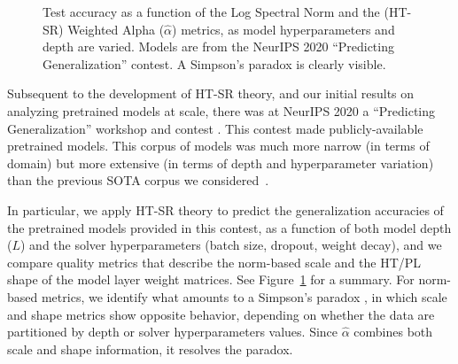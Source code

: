 \documentclass{article}
\begin{document}
\begin{figure}[t!] 
    \centering
    \caption{Test accuracy as a function of 
             the Log Spectral Norm and 
             the (HT-SR) Weighted Alpha ($\hat{\alpha}$) metrics,
             as model hyperparameters and depth are varied. 
             Models are from the NeurIPS 2020 ``Predicting Generalization'' contest.
             A Simpson's paradox is clearly visible.
            }
    \label{fig:simpsons}
\end{figure} 

Subsequent to the development of HT-SR theory, and our initial results on analyzing pretrained models at scale, there was at NeurIPS 2020 a ``Predicting Generalization'' workshop and contest \citep{JNBx19_fantastic_TR, JFYx20_contest_v10}.
This contest made publicly-available pretrained models.
This corpus of models was much more narrow (in terms of domain) but more extensive (in terms of depth and hyperparameter variation) than the previous SOTA corpus we considered~\citep{osmr}.

In particular, we apply HT-SR theory to predict the generalization accuracies of the pretrained models provided in this contest, as a function of both model depth ($L$) and the solver hyperparameters (batch size, dropout, weight decay), and we compare quality metrics that describe the norm-based scale and the HT/PL shape of the model layer weight matrices.  
See Figure~\ref{fig:simpsons} for a summary.
For norm-based metrics, we identify what amounts to a Simpson’s paradox \citep{BHO75}, in which scale and shape metrics show opposite behavior, depending on whether the data are partitioned by depth or solver hyperparameters values.
Since $\hat{\alpha}$ combines both scale and shape information, it resolves the paradox.
\end{document}
